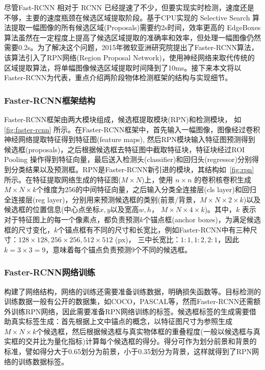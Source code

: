

尽管Fast-RCNN 相对于 RCNN 已经提速了不少，但要实现实时检测，速度还是不够，主要的速度瓶颈在候选区域提取阶段。基于CPU实现的 Selective Search 算法提取一幅图像的所有候选区域(Proposals)需要约2s时间，效率更高的 EdgeBoxes 算法虽然在一定程度上提高了候选区域提取的准确率和效率，但处理一幅图像仍然需要0.2s。为了解决这个问题，2015年微软亚洲研究院提出了Faster-RCNN算法，该算法引入了RPN网络(Region Proposal Network)，使用神经网络来取代传统的区域提取算法，将单幅图像候选区域提取时间降到了10ms。接下来本文将以Faster-RCNN为代表，重点介绍两阶段物体检测框架的结构与实现细节。

\subsubsection{Faster-RCNN框架结构}



Faster-RCNN框架由两大模块组成，候选框提取模块(RPN)和检测模块， 如 \figurename \, \ref{fig:faster-rcnn} 所示。在Faster-RCNN框架中，首先输入一幅图像，图像经过卷积神经网络提取特征得到特征图(feature maps), 然后RPN模块输入特征图预测得到候选框(proposals)，之后根据候选框去特征图中截取特征块，特征块经过ROI Pooling 操作得到特征向量，最后送入检测头(classifier)和回归头(regressor)分别得到分类结果以及预测框。RPN是Faster-RCNN新引进的模块，其结构如\figurename \, \ref{fig:rpn}所示。在特征提取网络生成的特征图($M \times N$)上，使用 $n \times n$ 的卷积核卷积生成$M \times N \times k$个维度为256的中间特征向量，之后输入分类全连接层(cls layer)和回归全连接层(reg layer)，分别用来预测候选框的类别(前景/背景，$M \times N \times 2 \times k$)以及候选框的位置信息(中心点坐标$x, y$以及宽高$w, h$， $M \times N \times 4 \times k$)。其中，$k$ 表示对于特征图上的每一个像素点，都负责预测$k$个锚点框(anchor boxes)，为满足候选框的尺寸变化，$k$个锚点框有不同的尺寸和长宽比，例如Faster-RCNN中有三种尺寸：$128\times 128, 256 \times 256, 512 \times 512$ (px)， 三中长宽比：$1:1, 1:2, 2:1$，因此 $k = 3 \times 3 = 9$，意味着每个锚点负责预测9个不同的候选框。

\subsubsection{Faster-RCNN网络训练}
构建了网络结构，网络的训练还需要准备训练数据，明确损失函数等。目标检测的训练数据一般有公开的数据集，如COCO，PASCAL等，然而Faster-RCNN还需额外训练RPN网络，因此需要准备RPN网络训练的标签。候选框标签的生成需要借助真实标签生成：首先根据上文中锚点的概念，以特征图尺寸为参照生成$M \times N \times k$个候选框，然后根据候选框与真实物体框的重叠程度(一般以候选框与真实框的交并比为量化指标)计算每个候选框的得分。得分可作为划分前景和背景的标准，譬如得分大于0.65划分为前景，小于0.35划分为背景，这样就得到了RPN网络的训练数据标签。


